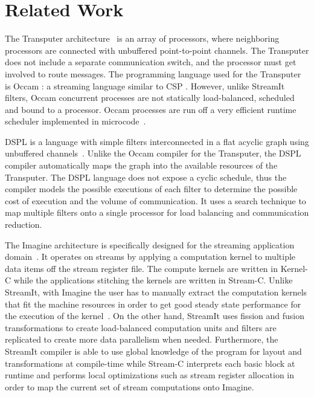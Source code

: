 \section{Related Work}
\label{sec:related}

The Transputer architecture~\cite{transputer88} is an array of
processors, where neighboring processors are connected with unbuffered
point-to-point channels.  The Transputer does not include a separate
communication switch, and the processor must get involved to route
messages.  The programming language used for the Transputer is Occam
\cite{occammanual}: a streaming language similar to CSP
\cite{Hoare78}.  However, unlike StreamIt filters, Occam concurrent
processes are not statically load-balanced, scheduled and bound to a
processor. Occam processes are run off a very efficient runtime
scheduler implemented in microcode~\cite{may87communicating}.

DSPL is a language with simple filters interconnected in a flat acyclic
graph using unbuffered channels~\cite{Thiel93}.  Unlike the Occam
compiler for the Transputer, the DSPL compiler automatically maps the
graph into the available resources of the Transputer. The DSPL language
does not expose a cyclic schedule, thus the compiler models the
possible executions of each filter to determine the possible cost of
execution and the volume of communication. It uses a search technique
to map multiple filters onto a single processor for load balancing and
communication reduction. 

The Imagine architecture is specifically designed for the streaming
application domain~\cite{rixner98bandwidthefficient}.  It operates on
streams by applying a computation kernel to multiple data items off
the stream register file.  The compute kernels are written in Kernel-C
while the applications stitching the kernels are written in Stream-C.
Unlike StreamIt, with Imagine the user has to manually extract the
computation kernels that fit the machine resources in order to get
good steady state performance for the execution of the
kernel~\cite{kapasi:2001:ss}.  On the other hand, StreamIt uses
fission and fusion transformations to create load-balanced computation
units and filters are replicated to create more data parallelism when
needed.  Furthermore, the StreamIt compiler is able to use global
knowledge of the program for layout and transformations at
compile-time while Stream-C interprets each basic block at runtime and
performs local optimizations such as stream register allocation in
order to map the current set of stream computations onto Imagine.


